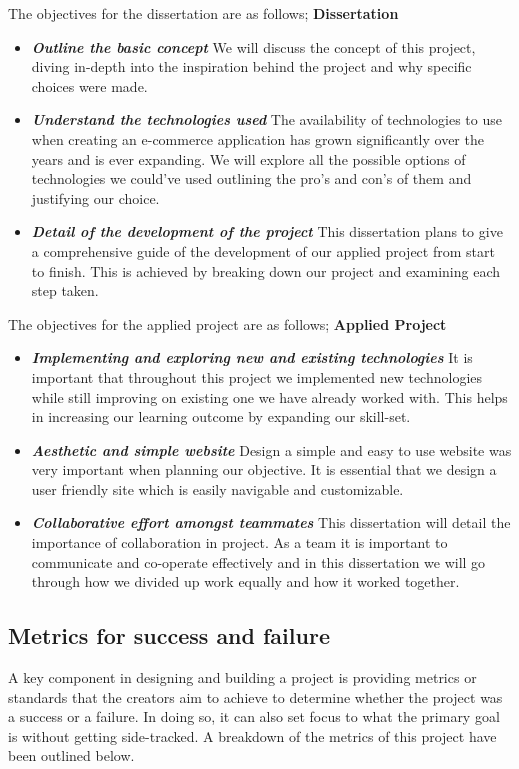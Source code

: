 The objectives for the dissertation are as follows;
\newline
\newline
\textbf{Dissertation}
\begin{itemize}
  \item \textbf{\textit{Outline the basic concept}} We will discuss the concept of this project, diving in-depth into the inspiration behind the project and why specific choices were made.
  \item \textbf{\textit{Understand the technologies used}} The availability of technologies to use when creating an e-commerce application has grown significantly over the years and is ever expanding. We will explore all the possible options of technologies we could've used outlining the pro's and con's of them and justifying our choice.
  \item \textbf{\textit{Detail of the development of the project}} This dissertation plans to give a comprehensive guide of the development of our applied project from start to finish. This is achieved by breaking down our project and examining each step taken.
\end{itemize}
The objectives for the applied project are as follows;
\newline
\newline
\textbf{Applied Project}
\begin{itemize}
  \item \textbf{\textit{Implementing and exploring new and existing technologies}} It is important that throughout this project we implemented new technologies while still improving on existing one we have already worked with. This helps in increasing our learning outcome by expanding our skill-set.
  \item \textbf{\textit{Aesthetic and simple website}} Design a simple and easy to use website was very important when planning our objective. It is essential that we design a user friendly site which is easily navigable and customizable.  
  \item \textbf{\textit{Collaborative effort amongst teammates}} This dissertation will detail the importance of collaboration in project. As a team it is important to communicate and co-operate effectively and in this dissertation we will go through how we divided up work equally and how it worked together.
\end{itemize}

\subsection{Metrics for success and failure}
A key component in designing and building a project is providing metrics or standards that the creators aim to achieve to determine whether the project was a success or a failure. In doing so, it can also set focus to what the primary goal is without getting side-tracked. A breakdown of the metrics of this project have been outlined below.

